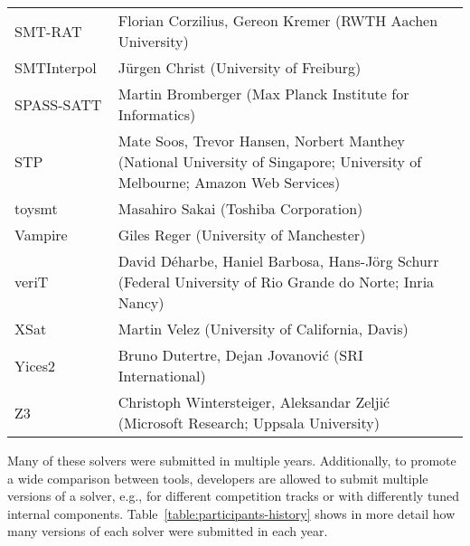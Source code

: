 \documentclass[twoside,11pt]{article}
\begin{document}
\begin{table}
\begin{tabular}{|l|p{11.5cm}|}
    SMT-RAT~\cite{DBLP:conf/sat/CorziliusKJSA15} & Florian Corzilius, Gereon Kremer
                        (RWTH Aachen University)\\
    SMTInterpol~\cite{DBLP:conf/spin/ChristHN12} & J\"urgen Christ
                        (University of Freiburg)\\
    SPASS-SATT         & Martin Bromberger
                        (Max Planck Institute for Informatics)\\
    STP~\cite{ganesh07} & Mate Soos, Trevor Hansen, Norbert Manthey
                        (National University of Singapore; University of Melbourne; Amazon Web Services)\\
    toysmt             & Masahiro Sakai
                        (Toshiba Corporation)\\
    Vampire~\cite{DBLP:conf/cav/KovacsV13} & Giles Reger
                        (University of Manchester)\\
    veriT~\cite{DBLP:conf/cade/BoutonODF09} & David D\'eharbe, Haniel Barbosa, Hans-J\"org Schurr
                        (Federal University of Rio Grande do Norte; Inria Nancy)\\
    XSat~\cite{DBLP:conf/cav/FuS16} & Martin Velez
                        (University of California, Davis)\\
    Yices2~\cite{Dutertre:cav2014} & Bruno Dutertre, Dejan Jovanovi\'c
                        (SRI International)\\
    Z3~\cite{DBLP:conf/tacas/MouraB08} & Christoph Wintersteiger, Aleksandar Zelji\'c
                        (Microsoft Research; Uppsala University)\\
    \hline
  \end{tabular}
\end{table}

Many of these solvers were submitted in multiple years.  Additionally,
to promote a wide comparison between tools, developers are allowed to
submit multiple versions of a solver, e.g., for different competition
tracks or with differently tuned internal components.
Table~\ref{table:participants-history} shows in more detail how many
versions of each solver were submitted in each year.
\end{document}
